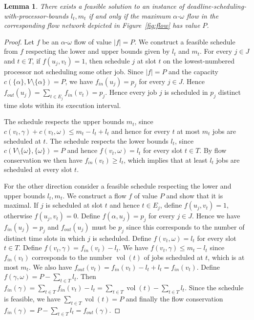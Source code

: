 \documentclass[a4paper]{article}
\DeclareMathOperator{\vol}{vol}
\newtheorem{lemma}[theorem]{Lemma}
\begin{document}
\begin{lemma}\label{lemma:flow_feasibility}
  There exists a feasible solution to an instance of deadline-scheduling-with-processor-bounds $l_t, m_t$ if and only if the maximum $\alpha$-$\omega$ flow in the corresponding flow network depicted in Figure~\ref{fig:flow} has value $P$.
\end{lemma}
\begin{proof}
  Let $f$ be an $\alpha$-$\omega$ flow of value $|f| = P$.
  We construct a feasible schedule from $f$ respecting the lower and upper bounds given by $l_t$ and $m_t$.
  For every $j \in J$ and  $t \in T$, if $f(u_j, v_t) = 1$, then schedule $j$ at slot $t$ on the lowest-numbered processor not scheduling some other job.
  Since $|f| = P$ and the capacity $c(\{\alpha\}, V \setminus \{\alpha\}) = P$, we have $f_{in}(u_j) = p_j$ for every $j \in J$.
  Hence $f_{out}(u_j) = \sum_{t \in E_j} f_{in}(v_t) = p_j$.
  Hence every job $j$ is scheduled in $p_j$ distinct time slots within its execution interval.

  The schedule respects the upper bounds $m_t$, since $c(v_t, \gamma) + c(v_t, \omega) \leq m_t - l_t + l_t$ and hence for every $t$ at most $m_t$ jobs are scheduled at $t$.
  The schedule respects the lower bounds $l_t$, since
  $c(V \setminus \{\omega\}, \{\omega\}) = P$ and hence
  $f(v_t, \omega) = l_t$ for every slot $t \in T$.
  By flow conservation we then have $f_{in}(v_t) \geq l_t$, which implies that at least $l_t$ jobs are scheduled at every slot $t$.

  For the other direction consider a feasible schedule respecting the lower and upper bounds $l_t, m_t$.
  We construct a flow $f$ of value $P$ and show that it is maximal.
  If $j$ is scheduled at slot $t$ and hence $t \in E_j$,
  define $f(u_j, v_t) = 1$, otherwise $f(u_j, v_t) = 0$.
  Define $f(\alpha, u_j) = p_j$ for every $j \in J$.
  Hence we have $f_{in}(u_j) = p_j$
  and $f_{out}(u_j)$ must be  $p_j$ since this corresponds to the number of distinct time slots in which $j$ is scheduled.
  Define $f(v_t, \omega) = l_t$ for every slot $t \in T$.
  Define $f(v_t, \gamma) = f_{in}(v_t) - l_t$.
  We have $f(v_t, \gamma) \leq m_t - l_t$ since $f_{in}(v_t)$ corresponds to the number $\vol(t)$ of jobs scheduled at $t$, which is at most $m_t$.
  We also have $f_{out}(v_t) = f_{in}(v_t) - l_t + l_t = f_{in}(v_t)$.
  Define $f(\gamma, \omega) = P - \sum_{t \in T} l_t$.
  Then $f_{in}(\gamma) = \sum_{t \in T} f_{in}(v_t) - l_t
  = \sum_{t \in T} \vol(t) - \sum_{t \in T} l_t$.
  Since the schedule is feasible, we have $\sum_{t \in T} \vol(t) = P$ and finally the flow conservation $f_{in}(\gamma) = P - \sum_{t \in T} l_t = f_{out}(\gamma)$.

\end{proof}
\end{document}
